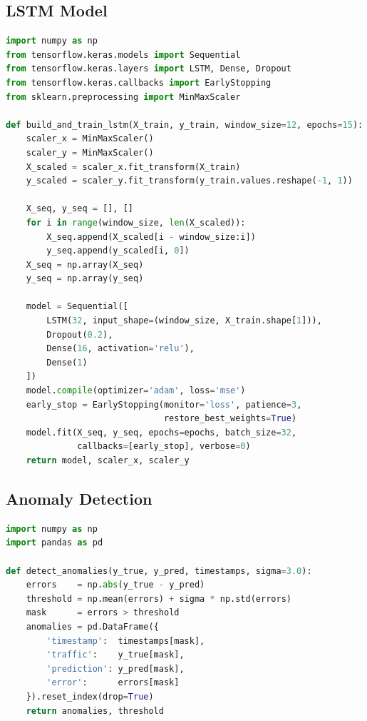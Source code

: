 \documentclass[12pt,a4paper]{article}
\begin{document}
\subsection{LSTM Model}

\begin{lstlisting}[language=Python, caption={LSTM Model --- src/lstm\_model.py}]
import numpy as np
from tensorflow.keras.models import Sequential
from tensorflow.keras.layers import LSTM, Dense, Dropout
from tensorflow.keras.callbacks import EarlyStopping
from sklearn.preprocessing import MinMaxScaler

def build_and_train_lstm(X_train, y_train, window_size=12, epochs=15):
    scaler_x = MinMaxScaler()
    scaler_y = MinMaxScaler()
    X_scaled = scaler_x.fit_transform(X_train)
    y_scaled = scaler_y.fit_transform(y_train.values.reshape(-1, 1))

    X_seq, y_seq = [], []
    for i in range(window_size, len(X_scaled)):
        X_seq.append(X_scaled[i - window_size:i])
        y_seq.append(y_scaled[i, 0])
    X_seq = np.array(X_seq)
    y_seq = np.array(y_seq)

    model = Sequential([
        LSTM(32, input_shape=(window_size, X_train.shape[1])),
        Dropout(0.2),
        Dense(16, activation='relu'),
        Dense(1)
    ])
    model.compile(optimizer='adam', loss='mse')
    early_stop = EarlyStopping(monitor='loss', patience=3,
                               restore_best_weights=True)
    model.fit(X_seq, y_seq, epochs=epochs, batch_size=32,
              callbacks=[early_stop], verbose=0)
    return model, scaler_x, scaler_y
\end{lstlisting}

\subsection{Anomaly Detection}

\begin{lstlisting}[language=Python, caption={Anomaly Detection --- src/anomaly\_detection.py}]
import numpy as np
import pandas as pd

def detect_anomalies(y_true, y_pred, timestamps, sigma=3.0):
    errors    = np.abs(y_true - y_pred)
    threshold = np.mean(errors) + sigma * np.std(errors)
    mask      = errors > threshold
    anomalies = pd.DataFrame({
        'timestamp':  timestamps[mask],
        'traffic':    y_true[mask],
        'prediction': y_pred[mask],
        'error':      errors[mask]
    }).reset_index(drop=True)
    return anomalies, threshold
\end{lstlisting}
\end{document}

